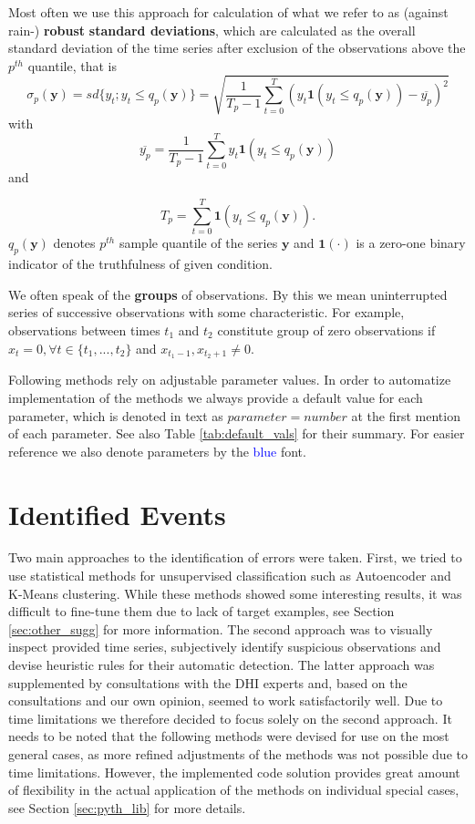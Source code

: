 \documentclass[12pt,a4paper]{article}
\begin{document}
Most often we use this approach for calculation of what we refer to as (against rain-) \textbf{robust} \textbf{standard deviations}, which are calculated as the overall standard deviation of the time series after exclusion of the observations above the $p^{th}$ quantile, that is 
\begin{equation}
    \label{eq:rob_sd}
    \sigma_p(\mathbf{y}) = sd\lbrace y_t; y_t \leq q_p(\mathbf{y}) \rbrace =  \sqrt{ \dfrac{1}{T_p-1}\sum_{t= 0}^{T}(y_{t}\mathbf{1}(y_t \leq q_p(\mathbf{y})) -\overline{y_p} )^{2} }  
\end{equation}
with 
$$ \overline{y_p} = \dfrac{1}{T_p-1}\sum_{t= 0}^{T}y_{t}\mathbf{1}(y_t \leq q_p(\mathbf{y})) $$
and

$$T_p = \sum_{t= 0}^{T}\mathbf{1}(y_t \leq q_p(\mathbf{y})).$$
$q_p(\mathbf{y})$ denotes  $p^{th}$  sample quantile of the series $\mathbf{y}$ and  $\mathbf{1}(\cdot)$ is a zero-one binary indicator of the truthfulness of given condition. 

We often speak of the \textbf{groups} of observations. By this we mean uninterrupted series of successive observations with some characteristic. For example, observations between times $t_1$ and $t_2$ constitute group of zero observations if $x_t=0, \forall t \in \lbrace t_1, ...,t_2 \rbrace$ and $x_{t_1-1}, x_{t_2+1} \neq 0$.

Following methods rely on adjustable parameter values. In order to automatize implementation of the methods we always provide a default value for each parameter, which is denoted in text as $parameter=number$ at the first mention of each parameter. See also Table \ref{tab:default_vals} for their summary. For easier reference we also denote parameters by the \textcolor{blue}{blue} font.


\newpage
\section{Identified Events}

Two main approaches to the identification of errors were taken. First, we tried to use statistical methods for unsupervised classification such as Autoencoder and K-Means clustering. While these methods showed some interesting results, it was difficult to fine-tune them due to lack of target examples, see Section \ref{sec:other_sugg} for more information. The second approach was to visually inspect provided time series, subjectively identify suspicious observations and devise heuristic  rules for their automatic detection. The latter approach was supplemented by  consultations with the DHI experts and, based on the consultations and our own opinion, seemed to work satisfactorily well. Due to time limitations we therefore decided to focus solely on the second approach. It needs to be noted that the following methods were devised for use on the most general cases, as more  refined adjustments of the methods was not possible due to time limitations. However, the implemented code solution provides great amount of flexibility in the actual application of the methods on individual special cases, see Section \ref{sec:pyth_lib} for more details.
\end{document}

